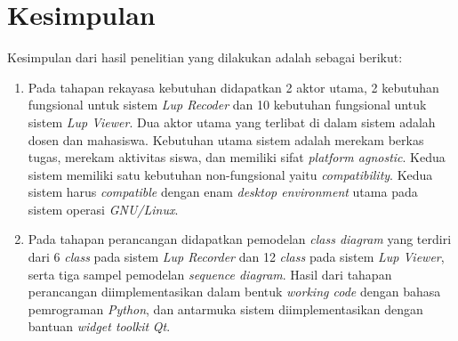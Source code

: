 

\section{Kesimpulan}

Kesimpulan dari hasil penelitian yang dilakukan adalah sebagai berikut:

\begin{enumerate}
\item Pada tahapan rekayasa kebutuhan didapatkan 2 aktor utama, 2
  kebutuhan fungsional untuk sistem \emph{Lup Recoder} dan 10
  kebutuhan fungsional untuk sistem \emph{Lup Viewer}. Dua aktor
  utama yang terlibat di dalam sistem adalah dosen dan
  mahasiswa. Kebutuhan utama sistem adalah merekam berkas tugas,
  merekam aktivitas siswa, dan memiliki sifat \emph{platform
    agnostic}. Kedua sistem memiliki satu kebutuhan non-fungsional
  yaitu \emph{compatibility}. Kedua sistem harus \emph{compatible}
  dengan enam \emph{desktop environment} utama pada sistem operasi
  \emph{GNU/Linux}.

\item Pada tahapan perancangan didapatkan pemodelan \emph{class
    diagram} yang terdiri dari 6 \emph{class} pada sistem \emph{Lup
    Recorder} dan 12 \emph{class} pada sistem \emph{Lup Viewer}, serta
  tiga sampel pemodelan \emph{sequence diagram}. Hasil dari tahapan
  perancangan diimplementasikan dalam bentuk \emph{working code}
  dengan bahasa pemrograman \emph{Python}, dan antarmuka sistem
  diimplementasikan dengan bantuan \emph{widget toolkit} \emph{Qt}.


\end{enumerate}
